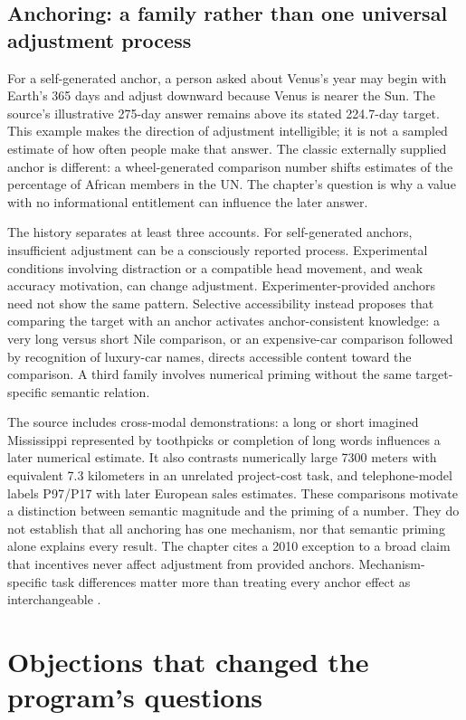 \subsection{Anchoring: a family rather than one universal adjustment process}

For a self-generated anchor, a person asked about Venus's year may begin
with Earth's 365 days and adjust downward because Venus is nearer the Sun.
The source's illustrative 275-day answer remains above its stated 224.7-day
target. This example makes the direction of adjustment intelligible; it
is not a sampled estimate of how often people make that answer. The classic
externally supplied anchor is different: a wheel-generated comparison
number shifts estimates of the percentage of African members in the UN.
The chapter's question is why a value with no informational entitlement
can influence the later answer.

The history separates at least three accounts. For self-generated anchors,
insufficient adjustment can be a consciously reported process. Experimental
conditions involving distraction or a compatible head movement, and weak
accuracy motivation, can change adjustment. Experimenter-provided anchors
need not show the same pattern. Selective accessibility instead proposes
that comparing the target with an anchor activates anchor-consistent
knowledge: a very long versus short Nile comparison, or an expensive-car
comparison followed by recognition of luxury-car names, directs accessible
content toward the comparison. A third family involves numerical priming
without the same target-specific semantic relation.

The source includes cross-modal demonstrations: a long or short imagined
Mississippi represented by toothpicks or completion of long words influences
a later numerical estimate. It also contrasts numerically large 7300
meters with equivalent 7.3 kilometers in an unrelated project-cost task,
and telephone-model labels P97/P17 with later European sales estimates.
These comparisons motivate a distinction between semantic magnitude and
the priming of a number. They do not establish that all anchoring has
one mechanism, nor that semantic priming alone explains every result.
The chapter cites a 2010 exception to a broad claim that incentives never
affect adjustment from provided anchors. Mechanism-specific task differences
matter more than treating every anchor effect as interchangeable
\cite[pp.~332--334]{GriffinEtAl2012HeuristicsHistory}.

\section{Objections that changed the program's questions}
\label{sec:p19-hph-objections}


